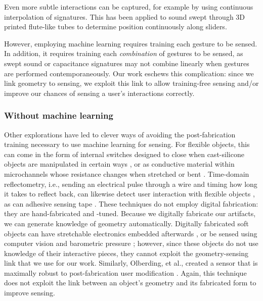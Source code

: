         Even more subtle interactions can be captured, for example by using continuous interpolation of signatures. This has been applied to sound swept through 3D printed flute-like tubes \cite{laput-acoustruments} to determine position continuously along sliders.
        
        However, employing machine learning requires training each gesture to be sensed. In addition, it requires training each \emph{combination} of gestures to be sensed, as swept sound or capacitance signatures may not combine linearly when gestures are performed contemporaneously. Our work eschews this complication: since we link geometry to sensing, we exploit this link to allow training-free sensing and/or improve our chances of sensing a user's interactions correctly.
    
    \subsubsection{Without machine learning}
        Other explorations have led to clever ways of avoiding the post-fabrication training necessary to use machine learning for sensing. For flexible objects, this can come in the form of internal switches designed to close when cast-silicone objects are manipulated in certain ways \cite{slyper-structure}, or as conductive material within microchannels whose resistance changes when stretched or bent \cite{majidi-curvature, park-microchannels}. Time-domain reflectometry, i.e., sending an electrical pulse through a wire and timing how long it takes to reflect back, can likewise detect user interaction with flexible objects \cite{wimmer-tdr}, as can adhesive sensing tape \cite{holman-tactiletape}. These techniques do not employ digital fabrication: they are hand-fabricated and -tuned. Because we digitally fabricate our artifacts, we can generate knowledge of geometry automatically. Digitally fabricated soft objects can have stretchable electronics embedded afterwards \cite{yao-pneui}, or be sensed using computer vision and barometric pressure \cite{harrison-buttons, slyper-pressure}; however, since these objects do not use knowledge of their interactive pieces, they cannot exploit the geometry-sensing link that we use for our work. Similarly, Olberding, et al., created a sensor that is maximally robust to post-fabrication user modification \cite{olberding-cuttable}. Again, this technique does not exploit the link between an object's geometry and its fabricated form to improve sensing.
        
